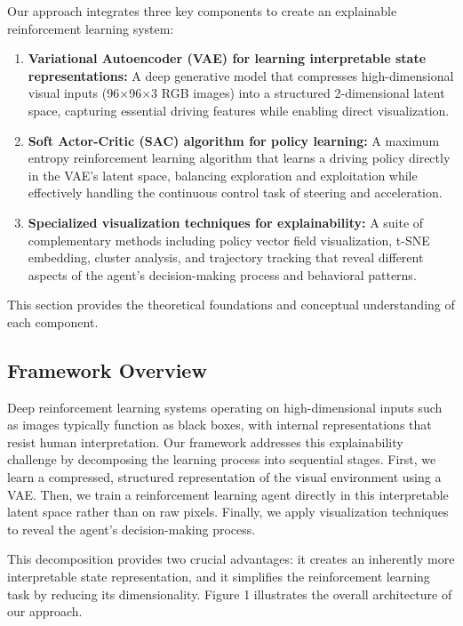 \documentclass[conference]{IEEEtran}
\begin{document}
Our approach integrates three key components to create an explainable reinforcement learning system:

\begin{enumerate}[label=\roman*.]
    \item \textbf{Variational Autoencoder (VAE) for learning interpretable state representations:} A deep generative model that compresses high-dimensional visual inputs (96$\times$96$\times$3 RGB images) into a structured 2-dimensional latent space, capturing essential driving features while enabling direct visualization.
    
    \item \textbf{Soft Actor-Critic (SAC) algorithm for policy learning:} A maximum entropy reinforcement learning algorithm that learns a driving policy directly in the VAE's latent space, balancing exploration and exploitation while effectively handling the continuous control task of steering and acceleration.
    
    \item \textbf{Specialized visualization techniques for explainability:} A suite of complementary methods including policy vector field visualization, t-SNE embedding, cluster analysis, and trajectory tracking that reveal different aspects of the agent's decision-making process and behavioral patterns.
\end{enumerate}

This section provides the theoretical foundations and conceptual understanding of each component.

\subsection{Framework Overview}

Deep reinforcement learning systems operating on high-dimensional inputs such as images typically function as black boxes, with internal representations that resist human interpretation. Our framework addresses this explainability challenge by decomposing the learning process into sequential stages. First, we learn a compressed, structured representation of the visual environment using a VAE. Then, we train a reinforcement learning agent directly in this interpretable latent space rather than on raw pixels. Finally, we apply visualization techniques to reveal the agent's decision-making process.

This decomposition provides two crucial advantages: it creates an inherently more interpretable state representation, and it simplifies the reinforcement learning task by reducing its dimensionality. Figure 1 illustrates the overall architecture of our approach.
\end{document}

